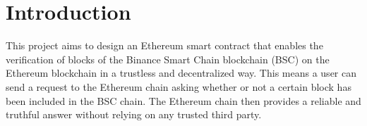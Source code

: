 \section{Introduction}

This project aims to design an Ethereum smart contract that enables the verification of blocks of the Binance Smart Chain blockchain (BSC) on the Ethereum blockchain in a trustless and decentralized way. This means a user can send a request to the Ethereum chain asking whether or not a certain block has been included in the BSC chain. The Ethereum chain then provides a reliable and truthful answer without relying on any trusted third party.